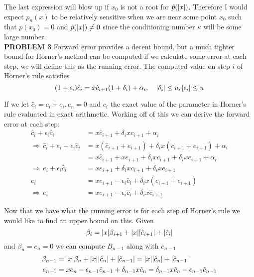 \documentclass[12pt]{article}
\DeclarePairedDelimiter \abs{\lvert}{\rvert}%
\theoremstyle{remark}
\begin{document}
The last expression will blow up if $x_0$ is not a root for $\tilde{p}(\abs{x})$. Therefore I would expect $p_n(x)$ to be relatively sensitive when we are near some point $x_0$ such that $p(x_0) = 0$ and $\tilde{p}(\abs{x}) \neq 0$ since the conditioning number $\kappa$ will be some large number. \\

\textbf{{PROBLEM 3}} Forward error provides a decent bound, but a much tighter bound for Horner's method can be computed if we calculate some error at each step, we will define this as the running error. The computed value on step $i$ of Horner's rule satisfies
$$ (1 + \epsilon_i)\hat{c}_i = x\hat{c}_{i+1}(1 + \delta_i) + \alpha_i, \quad \abs{\delta_i} \leq u, \abs{\epsilon_i} \leq u $$

If we let $\hat{c}_i = c_i + e_i, e_n = 0$ and $c_i$ the exact value of the parameter in Horner's rule evaluated in exact arithmetic. Working off of this we can derive the forward error at each step:
\begin{align*}
	\hat{c}_i + \epsilon_i\hat{c}_i & = x\hat{c}_{i+1} + \delta_ix\hat{c}_{i+1} + \alpha_i \\
	\Rightarrow \, \hat{c}_i + e_i + \epsilon_i\hat{c}_i & = x(\hat{c}_{i+1} + e_{i+1}) + \delta_ix(c_{i+1} + e_{i+1}) + \alpha_i \\
	& = x\hat{c}_{i+1} + xe_{i+1} + \delta_ixc_{i+1} + \delta_ixe_{i+1} + \alpha_i \\
	\Rightarrow \, e_i + \epsilon_i\hat{c}_i & = xe_{i+1} + \delta_ixc_{i+1} + \delta_ixe_{i+1} \\ 
	e_i & = xe_{i+1} - \epsilon_i\hat{c}_i + \delta_ix({c}_{i+1} + e_{i+1}) \\
	\Rightarrow \, e_i & = xe_{i+1} - \epsilon_i\hat{c}_i + \delta_ix\hat{c}_{i+1}
\end{align*}

Now that we have what the running error is for each step of Horner's rule we would like to find an upper bound on this. Given
$$ \beta_i = \abs{x}\beta_{i+1} + \abs{x}\abs{\hat{c}_{i+1}} + \abs{\hat{c}_i} $$
and $\beta_n = e_n = 0$ we can compute $B_{n-1}$ along with $e_{n-1}$
\begin{align*}
	\beta_{n-1} & = \abs{x}\beta_{n} + \abs{x}\abs{\hat{c}_{n}} + \abs{\hat{c}_{n-1}} = \abs{x}\abs{\hat{c}_{n}} + \abs{\hat{c}_{n-1}} \\
	e_{n-1} & = xe_n - \epsilon_{n-1}\hat{c}_{n-1} + \delta_{n-1}x\hat{c}_n = \delta_{n-1}x\hat{c}_n - \epsilon_{n-1}\hat{c}_{n-1}
\end{align*}
\end{document}
